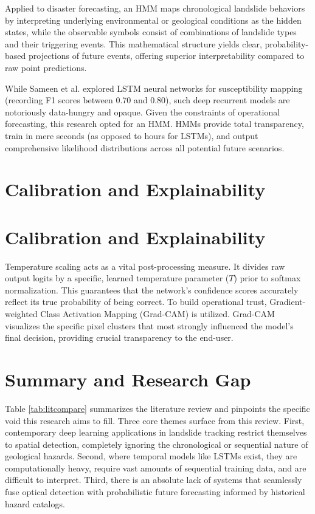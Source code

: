 \documentclass[12pt,a4paper]{report}
\begin{document}
Applied to disaster forecasting, an HMM maps chronological landslide behaviors by interpreting underlying environmental or geological conditions as the hidden states, while the observable symbols consist of combinations of landslide types and their triggering events. This mathematical structure yields clear, probability-based projections of future events, offering superior interpretability compared to raw point predictions.

While Sameen et al. \cite{sameen2020lstm} explored LSTM neural networks for susceptibility mapping (recording F1 scores between 0.70 and 0.80), such deep recurrent models are notoriously data-hungry and opaque. Given the constraints of operational forecasting, this research opted for an HMM. HMMs provide total transparency, train in mere seconds (as opposed to hours for LSTMs), and output comprehensive likelihood distributions across all potential future scenarios.

\section{Calibration and Explainability}
\section{Calibration and Explainability}
Temperature scaling \cite{guo2017calibration} acts as a vital post-processing measure. It divides raw output logits by a specific, learned temperature parameter ($T$) prior to softmax normalization. This guarantees that the network's confidence scores accurately reflect its true probability of being correct. To build operational trust, Gradient-weighted Class Activation Mapping (Grad-CAM) \cite{selvaraju2017gradcam} is utilized. Grad-CAM visualizes the specific pixel clusters that most strongly influenced the model’s final decision, providing crucial transparency to the end-user.

\section{Summary and Research Gap}
Table \ref{tab:litcompare} summarizes the literature review and pinpoints the specific void this research aims to fill. Three core themes surface from this review. First, contemporary deep learning applications in landslide tracking restrict themselves to spatial detection, completely ignoring the chronological or sequential nature of geological hazards. Second, where temporal models like LSTMs exist, they are computationally heavy, require vast amounts of sequential training data, and are difficult to interpret. Third, there is an absolute lack of systems that seamlessly fuse optical detection with probabilistic future forecasting informed by historical hazard catalogs.
\end{document}
